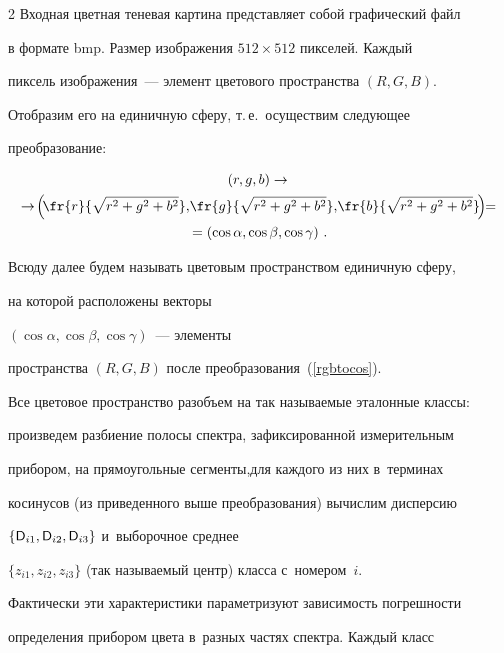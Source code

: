 \begin{multicols}{2}
Входная цветная теневая картина представляет собой графический файл

в формате bmp. Размер изображения $512 \times 512$ пикселей. Каждый

пиксель изображения~--- элемент цветового пространства $(R, G, B)$.

Отобразим его на единичную сферу, т.\,е.\ осуществим следующее

преобразование:

{ %

\begin{multline}

(r,g,b)\to{}\\

\!\to\!\left(\!\fr{r}{\sqrt{r^2+g^2+b^2}},\!\fr{g}{\sqrt{r^2+g^2+b^2}},\!

\fr{b}{\sqrt{r^2+g^2+b^2}}\!\right)\!\!=\\

\label{rgbtocos}

=\left(\cos{\alpha},\cos{\beta},\cos{\gamma}\right)\,.

\end{multline}

}



Всюду далее будем называть цветовым пространством единичную сферу, 

на которой расположены векторы

$\left(\cos{\alpha},\cos{\beta},\cos{\gamma}\right)$~--- элементы 

пространства $(R, G, B)$ после преобразования~(\ref{rgbtocos}).



Все цветовое пространство разобъем на так называемые эталонные классы:

произведем разби\-ение полосы спектра, зафиксированной измерительным

прибором, на прямоугольные сегменты,\linebreak для каждого из них в~терминах

косинусов (из приведенного выше преобразования) вычислим дисперсию

$\{{\sf D}_{i1},{\sf D}_{i2},{\sf D}_{i3}\}$ и~выборочное среднее

$\{z_{i1},z_{i2},z_{i3}\}$ (так называемый центр) класса с~номером~$i$.

Фактически эти характеристики параметризуют зависимость погрешности

определения прибором цвета в~разных частях спектра. Каждый класс


\end{multicols}
